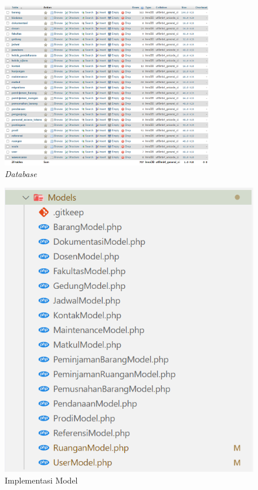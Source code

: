 \begin{figure}
	\centering
	\includegraphics[width=0.82\textwidth]{konten/gambar/implementasi/database.png}
	\caption{\textit{Database}}
	\label{database-manlab}
\end{figure}

\begin{figure}
	\centering
	\includegraphics[width=0.82\linewidth]{konten//gambar/implementasi-folder/folder-model.png}
	\caption{Implementasi Model}
	\label{fig:implementasi-model}
\end{figure}

